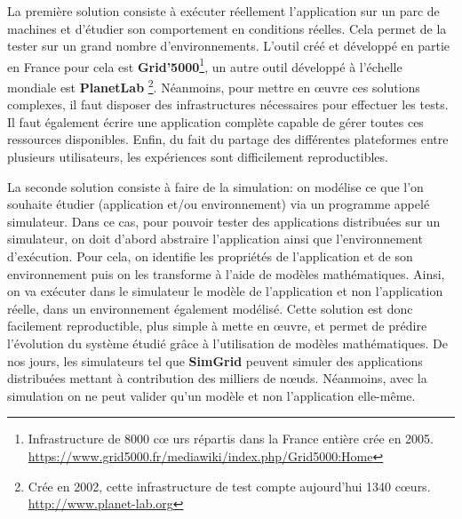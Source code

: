 La première solution consiste à exécuter réellement l'application sur un parc de
machines et d'étudier son comportement en conditions réelles. Cela permet de la
tester sur un grand nombre d'environnements. L'outil créé et développé en partie
en France pour cela est \textbf{Grid'5000}\footnote{Infrastructure de 8000 c\oe
  urs répartis dans la France entière crée en
  2005. \\ \url{https://www.grid5000.fr/mediawiki/index.php/Grid5000:Home}}\citep{GRID5000},
un autre outil développé à l'échelle mondiale est
\textbf{PlanetLab} \footnote{Crée en 2002, cette infrastructure de test compte
  aujourd'hui 1340 c\oe urs. \\ \url{http://www.planet-lab.org}}. Néanmoins,
pour mettre en \oe uvre ces solutions complexes, il faut disposer des
infrastructures nécessaires pour effectuer les tests. Il faut également écrire
une application complète capable de gérer toutes ces ressources
disponibles. Enfin, du fait du partage des différentes plateformes entre
plusieurs utilisateurs, les expériences sont difficilement reproductibles.

La seconde solution consiste à faire de la simulation: on modélise ce que l'on
souhaite étudier (application et/ou environnement) via un programme appelé
simulateur. Dans ce cas, pour pouvoir tester des applications distribuées sur un
simulateur, on doit d'abord abstraire l'application ainsi que l'environnement
d'exécution. Pour cela, on identifie les propriétés de l'application et de son
environnement puis on les transforme à l'aide de modèles mathématiques. Ainsi,
on va exécuter dans le simulateur le modèle de l'application et non
l'application réelle, dans un environnement également modélisé. Cette solution
est donc facilement reproductible, plus simple à mette en \oe uvre, et permet de
prédire l'évolution du système étudié grâce à l'utilisation de modèles
mathématiques. De nos jours, les simulateurs tel que
\textbf{SimGrid}\citep{CASANOVA:SimGrid, MARTIN:SimGrid} peuvent simuler des
applications distribuées mettant à contribution des milliers de
n\oe uds. Néanmoins, avec la simulation on ne peut valider qu'un modèle et non
l'application elle-même.

